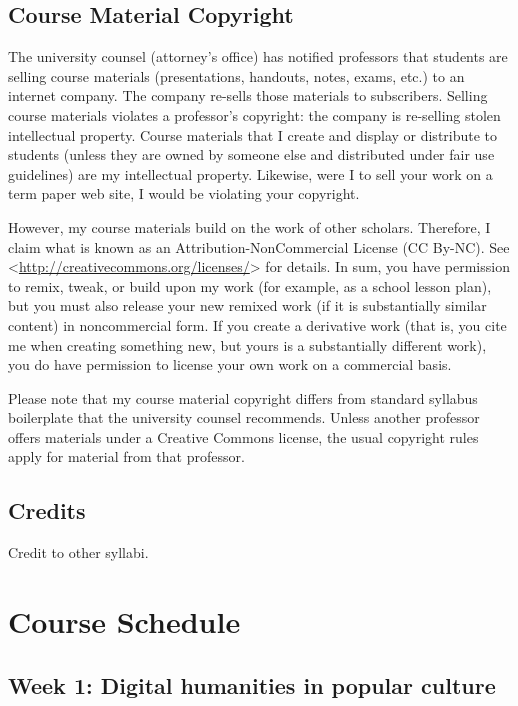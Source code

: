 \documentclass[]{article}
\begin{document}
\subsection{Course Material Copyright}\label{course-material-copyright}

The university counsel (attorney's office) has notified professors that
students are selling course materials (presentations, handouts, notes,
exams, etc.) to an internet company. The company re-sells those
materials to subscribers. Selling course materials violates a
professor's copyright: the company is re-selling stolen intellectual
property. Course materials that I create and display or distribute to
students (unless they are owned by someone else and distributed under
fair use guidelines) are my intellectual property. Likewise, were I to
sell your work on a term paper web site, I would be violating your
copyright.

However, my course materials build on the work of other scholars.
Therefore, I claim what is known as an Attribution-NonCommercial License
(CC By-NC). See
\textless{}\url{http://creativecommons.org/licenses/}\textgreater{} for
details. In sum, you have permission to remix, tweak, or build upon my
work (for example, as a school lesson plan), but you must also release
your new remixed work (if it is substantially similar content) in
noncommercial form. If you create a derivative work (that is, you cite
me when creating something new, but yours is a substantially different
work), you do have permission to license your own work on a commercial
basis.

Please note that my course material copyright differs from standard
syllabus boilerplate that the university counsel recommends. Unless
another professor offers materials under a Creative Commons license, the
usual copyright rules apply for material from that professor.

\subsection{Credits}\label{credits}

Credit to other syllabi.

\section{Course Schedule}\label{course-schedule}

\subsection{Week 1: Digital humanities in popular
culture}\label{week-1-digital-humanities-in-popular-culture}
\end{document}
